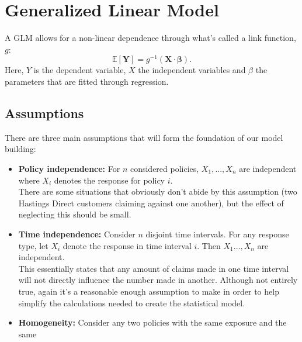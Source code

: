 \documentclass{article}
\begin{document}
\section{Generalized Linear Model}
A GLM allows for a non-linear dependence through what's called a link function, $g$:
\begin{equation}
    \mathbb{E}[\mathbf{Y}] = g^{-1}(\mathbf{X}\cdot\mathbf{\beta}).
\end{equation}
Here, $Y$ is the dependent variable, $X$ the independent variables and $\beta$ the parameters that are fitted through regression. 
\subsection{Assumptions}
There are three main assumptions that will form the foundation of our model building:
\begin{itemize}
    \item \textbf{Policy independence:} For $n$ considered policies, $X_1,\ldots,X_n$ are independent where $X_i$ denotes the response for policy $i$.\\
    There are some situations that obviously don't abide by this assumption (two Hastings Direct customers claiming against one another), but the effect of neglecting this should be small.
    \item \textbf{Time independence:} Consider $n$ disjoint time intervals. For any response type, let $X_i$ denote the response in time interval $i$. Then $X_1\ldots,X_n$ are independent.\\
    This essentially states that any amount of claims made in one time interval will not directly influence the number made in another. Although not entirely true, again it's a reasonable enough assumption to make in order to help simplify the calculations needed to create the statistical model.
    \item \textbf{Homogeneity:} Consider any two policies with the same exposure and the same 
\end{itemize}

\nocite{2008APG}
\nocite{géron2019hands}
\nocite{GLM_basics}
\printbibliography
\end{document}
